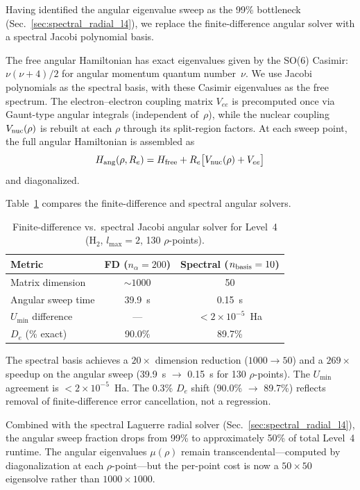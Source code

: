 \documentclass[aps,pra,twocolumn,superscriptaddress,longbibliography]{revtex4-2}
\begin{document}
Having identified the angular eigenvalue sweep as the 99\% bottleneck
(Sec.~\ref{sec:spectral_radial_l4}), we replace the finite-difference
angular solver with a spectral Jacobi polynomial basis.

The free angular Hamiltonian has exact eigenvalues given by the SO(6)
Casimir: $\nu(\nu+4)/2$ for angular momentum quantum number~$\nu$.
We use Jacobi polynomials as the spectral basis, with these Casimir
eigenvalues as the free spectrum.  The electron--electron coupling
matrix $V_{ee}$ is precomputed once via Gaunt-type angular integrals
(independent of~$\rho$), while the nuclear coupling $V_{\rm nuc}(\rho)$
is rebuilt at each $\rho$ through its split-region factors.  At each sweep point, the full angular
Hamiltonian is assembled as
\begin{equation}
  H_{\rm ang}(\rho, R_e) = H_{\rm free} + R_e\bigl[V_{\rm nuc}(\rho) + V_{ee}\bigr]
\end{equation}
and diagonalized.

Table~\ref{tab:spectral_angular_l4} compares the finite-difference
and spectral angular solvers.

\begin{table}[h]
\caption{Finite-difference vs.\ spectral Jacobi angular solver for
Level~4 (H$_2$, $l_{\max} = 2$, 130 $\rho$-points).}
\label{tab:spectral_angular_l4}
\begin{ruledtabular}
\begin{tabular}{lcc}
  Metric & FD ($n_\alpha = 200$) & Spectral ($n_{\rm basis} = 10$) \\
  \hline
  Matrix dimension      & ${\sim}1000$ & 50 \\
  Angular sweep time    & 39.9~s       & 0.15~s \\
  $U_{\min}$ difference & ---          & $< 2 \times 10^{-5}$~Ha \\
  $D_e$ (\% exact)      & 90.0\%       & 89.7\% \\
\end{tabular}
\end{ruledtabular}
\end{table}

The spectral basis achieves a $20\times$ dimension reduction
($1000 \to 50$) and a $269\times$ speedup on the angular sweep
(39.9~s $\to$ 0.15~s for 130 $\rho$-points).  The $U_{\min}$
agreement is $< 2 \times 10^{-5}$~Ha.  The 0.3\% $D_e$ shift
(90.0\% $\to$ 89.7\%) reflects removal of finite-difference error
cancellation, not a regression.

Combined with the spectral Laguerre radial solver
(Sec.~\ref{sec:spectral_radial_l4}), the angular sweep fraction
drops from 99\% to approximately 50\% of total Level~4 runtime.
The angular eigenvalues $\mu(\rho)$ remain transcendental---computed
by diagonalization at each $\rho$-point---but the per-point cost
is now a $50 \times 50$ eigensolve rather than
$1000 \times 1000$.
\end{document}

